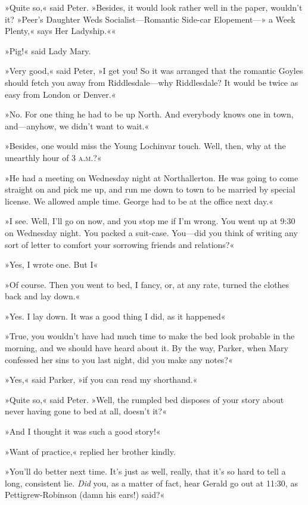 »Quite so,« said Peter. »Besides, it would look rather well in the paper, wouldn't it? »Peer's Daughter Weds Socialist—Romantic Side-car Elopement—» a Week Plenty,« says Her Ladyship.««

»Pig!« said Lady Mary.

»Very good,« said Peter, »I get you! So it was arranged that the romantic Goyles should fetch you away from Riddlesdale—why Riddlesdale? It would be twice as easy from London or Denver.«

»No. For one thing he had to be up North. And everybody knows one in town, and—anyhow, we didn't want to wait.«

»Besides, one would miss the Young Lochinvar touch. Well, then, why at the unearthly hour of 3 \textsc{a.m.}?«

»He had a meeting on Wednesday night at Northallerton. He was going to come straight on and pick me up, and run me down to town to be married by special license. We allowed ample time. George had to be at the office next day.«

»I see. Well, I'll go on now, and you stop me if I'm wrong. You went up at 9:30 on Wednesday night. You packed a suit-case. You—did you think of writing any sort of letter to comfort your sorrowing friends and relations?«

»Yes, I wrote one. But I\longdash«

»Of course. Then you went to bed, I fancy, or, at any rate, turned the clothes back and lay down.«

»Yes. I lay down. It was a good thing I did, as it happened\longdash«

»True, you wouldn't have had much time to make the bed look probable in the morning, and we should have heard about it. By the way, Parker, when Mary confessed her sins to you last night, did you make any notes?«

»Yes,« said Parker, »if you can read my shorthand.«

»Quite so,« said Peter. »Well, the rumpled bed disposes of your story about never having gone to bed at all, doesn't it?«

»And I thought it was such a good story!«

»Want of practice,« replied her brother kindly.

»You'll do better next time. It's just as well, really, that it's so hard to tell a long, consistent lie. \textit{Did} you, as a matter of fact, hear Gerald go out at 11:30, as Pettigrew-Robinson (damn his ears!) said?«

